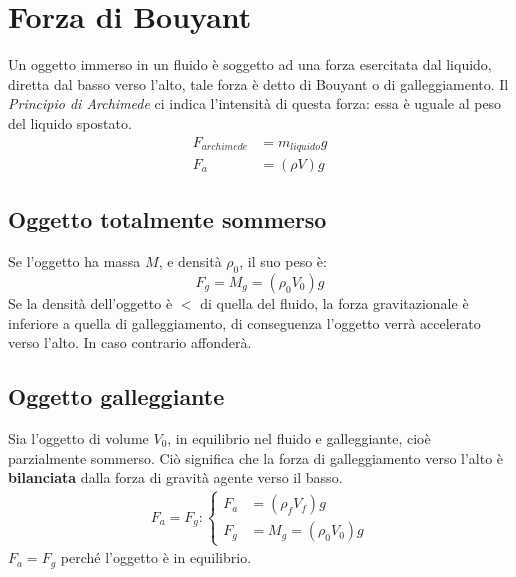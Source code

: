     \section{Forza di Bouyant} Un oggetto immerso in un fluido è soggetto ad 
    una forza esercitata dal liquido, diretta dal basso verso l'alto, tale 
    forza è detto di Bouyant o di galleggiamento.
    Il \textit{Principio di Archimede} ci indica l'intensità di questa forza:
    essa è uguale al peso del liquido spostato.
        \begin{align}
            F_{archimede} &= m_{liquido}g \\
            F_a &= (\rho V) g
        \end{align}

        \subsection{Oggetto totalmente sommerso} Se l'oggetto ha massa $M$, e
        densità $\rho_0$, il suo peso è:
            \begin{equation}
                F_g = M_g = (\rho_0 V_0) g
            \end{equation}
        Se la densità dell'oggetto è $<$ di quella del fluido, la forza 
        gravitazionale è inferiore a quella di galleggiamento, di conseguenza
        l'oggetto verrà accelerato verso l'alto. In caso contrario affonderà.

        \subsection{Oggetto galleggiante} Sia l'oggetto di volume $V_0$, in 
        equilibrio nel fluido e galleggiante, cioè parzialmente sommerso. Ciò
        significa che la forza di galleggiamento verso l'alto è 
        \textbf{bilanciata} dalla forza di gravità agente verso il basso.
            \begin{align}
                F_a = F_g :
                \begin{cases}
                    F_a &= (\rho_f V_f)g \\
                    F_g &= M_g = (\rho_0 V_0)g
                \end{cases}
            \end{align}
        $F_a = F_g$ perché l'oggetto è in equilibrio.

